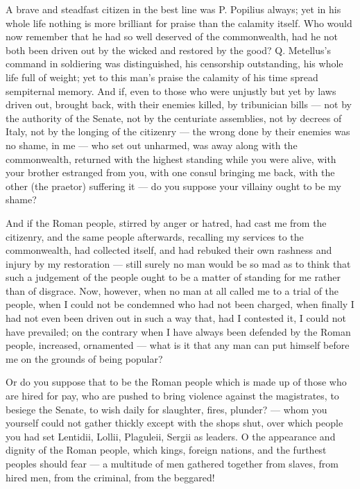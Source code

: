  A brave and steadfast citizen in the best line was P. Popilius always; yet in his whole life nothing is more brilliant for praise than the calamity itself. Who would now remember that he had so well deserved of the commonwealth, had he not both been driven out by the wicked and restored by the good? Q. Metellus's command in soldiering was distinguished, his censorship outstanding, his whole life full of weight; yet to this man's praise the calamity of his time spread sempiternal memory. And if, even to those who were unjustly but yet by laws driven out, brought back, with their enemies killed, by tribunician bills --- not by the authority of the Senate, not by the centuriate assemblies, not by decrees of Italy, not by the longing of the citizenry --- the wrong done by their enemies was no shame, in me --- who set out unharmed, was away along with the commonwealth, returned with the highest standing while you were alive, with your brother estranged from you, with one consul bringing me back, with the other (the praetor) suffering it --- do you suppose your villainy ought to be my shame?

 And if the Roman people, stirred by anger or hatred, had cast me from the citizenry, and the same people afterwards, recalling my services to the commonwealth, had collected itself, and had rebuked their own rashness and injury by my restoration --- still surely no man would be so mad as to think that such a judgement of the people ought to be a matter of standing for me rather than of disgrace. Now, however, when no man at all called me to a trial of the people, when I could not be condemned who had not been charged, when finally I had not even been driven out in such a way that, had I contested it, I could not have prevailed; on the contrary when I have always been defended by the Roman people, increased, ornamented --- what is it that any man can put himself before me on the grounds of being popular?

 Or do you suppose that to be the Roman people which is made up of those who are hired for pay, who are pushed to bring violence against the magistrates, to besiege the Senate, to wish daily for slaughter, fires, plunder? --- whom you yourself could not gather thickly except with the shops shut, over which people you had set Lentidii, Lollii, Plaguleii, Sergii as leaders. O the appearance and dignity of the Roman people, which kings, foreign nations, and the furthest peoples should fear --- a multitude of men gathered together from slaves, from hired men, from the criminal, from the beggared!

